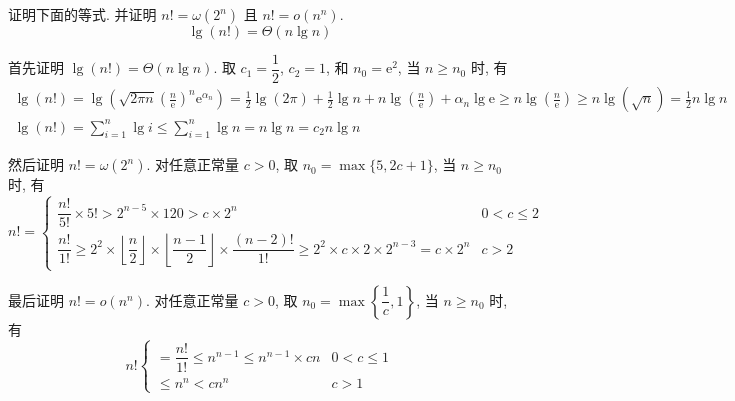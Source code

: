 \documentclass[boxes]{homework}
\begin{document}
\begin{problem}
证明下面的等式. 并证明 $n! = \omega \left( 2^{n}\right)$ 且 $n! = o \left(
    n^{n}\right)$.
\begin{equation}
    \lg \left( n!\right) = \Theta \left( n\lg n\right)
\end{equation}
\end{problem}
\begin{solution}
    首先证明 $\lg \left( n!\right) = \Theta \left( n \lg n\right)$. 取 $c_{1} =
        \dfrac{ 1 }{ 2 }$, $c_{2} = 1$, 和 $n_{0} = \mathrm{e}^{2}$, 当 $n
        \geqslant n_{0}$ 时, 有
    \begin{gather}
        \label{eq:7}
        \lg \left( n!\right) = \lg \left( \sqrt{2\pi n} {\left( \frac{ n }{
                \mathrm{e} }\right)}^{n} \mathrm{e}^{\alpha_{n}}\right) =
        \frac{ 1 }{ 2 }\lg \left( 2\pi\right) + \frac{ 1 }{ 2 }\lg n +
        n\lg \left( \frac{ n }{ \mathrm{e} }\right) + \alpha_{n}\lg
        \mathrm{e} \geqslant n\lg \left( \frac{ n }{ \mathrm{e} }\right)
        \geqslant n\lg \left( \sqrt{n}\right) = \frac{ 1 }{ 2 } n\lg n\\
        \lg \left( n!\right) = \sum_{i = 1}^{n} \lg i \leqslant
        \sum_{i = 1}^{n} \lg n = n\lg n = c_{2} n\lg n
    \end{gather}

    然后证明 $n! = \omega \left( 2^{n}\right)$. 对任意正常量 $c > 0$, 取 $n_{0}
        = \max\{5, 2c + 1\}$, 当 $n \geqslant n_{0}$ 时, 有
    \begin{equation}
        n! =
        \begin{cases}
            \dfrac{ n! }{ 5! } \times 5! > 2^{n - 5} \times 120 > c \times
            2^{n}                                               & 0 < c \leqslant 2 \\
            \dfrac{ n! }{ 1! } \geqslant 2^{2} \times \left\lfloor
            \dfrac{ n }{ 2 } \right\rfloor \times \left\lfloor \dfrac{ n - 1 }
            { 2 } \right\rfloor \times \dfrac{ (n - 2)! }{ 1! } \geqslant 2^{2}
            \times c \times 2 \times 2^{n - 3} = c \times 2^{n} & c > 2
        \end{cases}
    \end{equation}

    最后证明 $n! = o \left( n^{n}\right)$. 对任意正常量 $c > 0$, 取 $n_{0} =
        \max \left\{ \dfrac{ 1 }{ c }, 1 \right\}$, 当 $n \geqslant n_{0}$ 时,
    有
    \begin{equation}
        n!
        \begin{cases}
            = \dfrac{ n! }{ 1! } \leqslant n^{n - 1} \leqslant n^{n - 1} \times
            cn                       & 0 < c \leqslant 1 \\
            \leqslant n^{n} < cn^{n} & c > 1
        \end{cases}
    \end{equation}
\end{solution}
\end{document}
